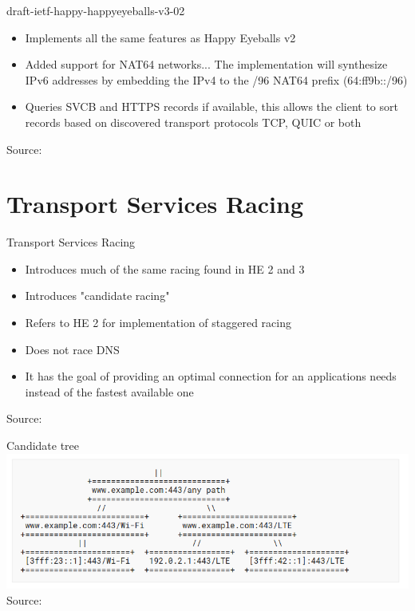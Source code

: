 \documentclass[aspectratio=169]{beamer}
\begin{document}
\begin{frame}{draft-ietf-happy-happyeyeballs-v3-02}
  \begin{itemize}
    \item Implements all the same features as Happy Eyeballs v2
    \item Added support for NAT64 networks... The implementation will synthesize IPv6 addresses by embedding the IPv4 to the /96 NAT64 prefix (64:ff9b::/96)
    \item Queries SVCB and HTTPS records if available, this allows the client to sort records based on discovered transport protocols TCP, QUIC or both
  \end{itemize}
  \centering
  {\tiny Source: }
\end{frame}

\section{Transport Services Racing}
\begin{frame}{Transport Services Racing}
  \begin{itemize}
    \item Introduces much of the same racing found in HE 2 and 3
    \item Introduces "candidate racing"
    \item Refers to HE 2 for implementation of staggered racing
    \item Does not race DNS
    \item It has the goal of providing an optimal connection for an applications needs instead of the fastest available one
  \end{itemize}
  \centering
  {\tiny Source: }
\end{frame}

\begin{frame}{Candidate tree}
  \centering
  \includegraphics[width=1\textwidth]{candidate_tree.png}
  \\
  {\tiny Source: }
\end{frame}
\end{document}
